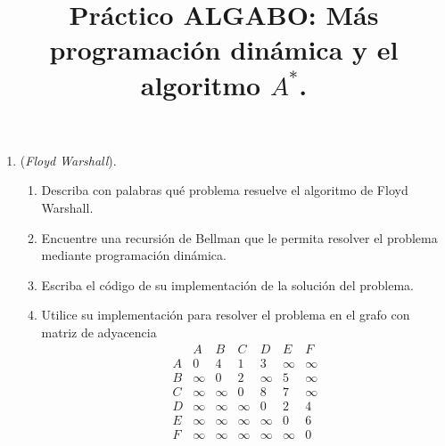 \documentclass[12pt, a4paper]{article}
\date{}
\begin{document}
\title{Pr\'actico ALGABO: Más programación dinámica y el algoritmo $A^*$.}
\maketitle{}
\begin{enumerate}
\item ({\it Floyd Warshall}). 
\begin{enumerate}
\item Describa con palabras qué problema resuelve el algoritmo de Floyd Warshall.

\item Encuentre una recursión de Bellman que le permita resolver el problema mediante programación dinámica.

\item Escriba el código de su implementación de la solución del problema.
\item Utilice su implementación para resolver el problema en el grafo con matriz de adyacencia
\[
\begin{array}{c|cccccc}
    & A & B & C & D & E & F \\
\hline
A & 0 & 4 & 1 & 3 & \infty & \infty \\
B & \infty & 0 & 2 & \infty & 5 & \infty \\
C & \infty & \infty & 0 & 8 & 7 & \infty \\
D & \infty & \infty & \infty & 0 & 2 & 4 \\
E & \infty & \infty & \infty & \infty & 0 & 6 \\
F & \infty & \infty & \infty & \infty & \infty & 0 \\
\end{array}
\]
\end{enumerate}



\end{enumerate}
\end{document}
